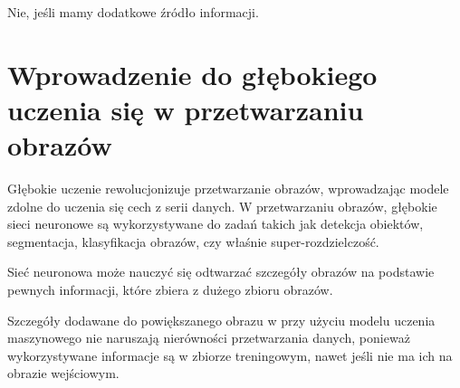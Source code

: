 Nie, jeśli mamy dodatkowe źródło informacji. 


\section{Wprowadzenie do głębokiego uczenia się w przetwarzaniu obrazów}

Głębokie uczenie rewolucjonizuje przetwarzanie obrazów, wprowadzając modele zdolne do uczenia się cech z serii danych. W przetwarzaniu obrazów, głębokie sieci neuronowe są wykorzystywane do zadań takich jak detekcja obiektów, segmentacja, klasyfikacja obrazów, czy właśnie super-rozdzielczość.

Sieć neuronowa może nauczyć się odtwarzać szczegóły obrazów na podstawie pewnych informacji, które zbiera z dużego zbioru obrazów. 

Szczegóły dodawane do powiększanego obrazu w przy użyciu modelu uczenia maszynowego nie naruszają nierówności przetwarzania danych, ponieważ wykorzystywane informacje są w zbiorze treningowym, nawet jeśli nie ma ich na obrazie wejściowym.







